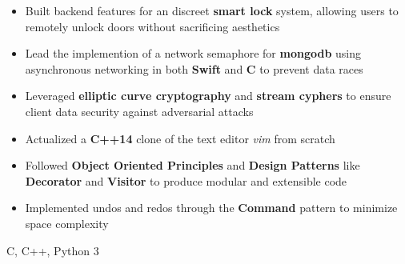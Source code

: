 \documentclass[10pt,a4paper,ragged2e]{altacv}
\begin{document}
\begin{paracol}{2}
\divider

\begin{itemize}
    \item Built backend features for an discreet \textbf{smart lock} system,
        allowing users to remotely unlock doors without sacrificing aesthetics
    \item Lead the implemention of a network semaphore for \textbf{mongodb} using asynchronous networking in both \textbf{Swift} and \textbf{C} to prevent data races
    \item Leveraged \textbf{elliptic curve cryptography} and \textbf{stream cyphers} to ensure client data security against adversarial attacks
\end{itemize}

\iffalse
\cvevent{Pleter}{}{May 2019}{\href{https://github.com/felix990302/word\_completion}{github.com/felix990302/word\_completion}}
\begin{itemize}
    \item Designed a concurrent autocompletion engine using a variation of \textbf{range trees} consisting of a \textbf{compressed trie} and sorted arrays in \textbf{C++}
    \item Accounted for race conditions and deadlocks using fine-grained read-write lock hierarchies
    \item Incorporated \textbf{gprof} as profiler for optimizations including a static \textbf{fixed-size allocator} to achieve \textbf{20x} speedup
\end{itemize}

\divider
\fi
{}
\begin{itemize}
    \item Actualized a \textbf{C++14} clone of the text editor \emph{vim} from scratch
    \item Followed \textbf{Object Oriented Principles} and \textbf{Design Patterns} like \textbf{Decorator} and \textbf{Visitor} to produce modular and extensible code
    \item Implemented undos and redos through the \textbf{Command} pattern to minimize space complexity
\end{itemize}

\switchcolumn

C, C++, Python 3


\end{paracol}
\end{document}
